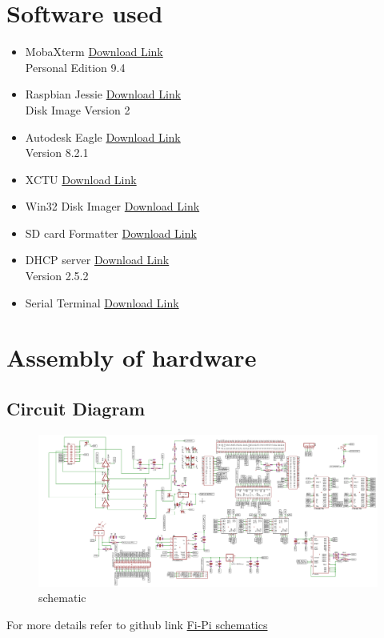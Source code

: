 \documentclass[a4paper,12pt,oneside]{book}
\begin{document}
	\section{Software used}
	\begin{itemize}
		\item MobaXterm  
		\href{http://mobaxterm.mobatek.net/MobaXterm_Setup_9.4.msi} {Download Link}\\
		Personal Edition 9.4
		\item Raspbian Jessie   
		\href{https://downloads.raspberrypi.org/raspbian_latest}{Download Link}\\
		Disk Image Version 2
		\item Autodesk Eagle 
		\href{http://www.cadsoftusa.com/download-eagle/}{Download Link}\\
		Version 8.2.1 
		\item XCTU 
		\href{http://www.digi.com/products/xbee-rf-solutions/xctu-software/xctu#productsupport-utilities}{Download Link}
		\item Win32 Disk Imager
		\href{http://sourceforge.net/projects/win32diskimager/}{Download Link}
		\item SD card Formatter
		\href{https://www.sdcard.org/downloads/formatter_4/eula_windows/}{Download Link}
		\item DHCP server
		\href{http://www.dhcpserver.de/cms/release_notes/2-5-2/}{Download Link}\\
		Version 2.5.2
		\item Serial Terminal 
		\href{https://serial-port-terminal.en.softonic.com/}{Download Link}
	\end{itemize}
	
	\section{Assembly of hardware}
	\subsection*{Circuit Diagram}
	\begin{figure}[!ht]
		\includegraphics[width=1.1\textwidth]{schematic}
		\caption{schematic }
	\end{figure}
For more details refer to github link \href{https://github.com/eYSIP-2017/eYSIP-2017_Fi_Pi/blob/master/Documents/PCB_Schematics/Fi-Pi.sch} {Fi-Pi schematics}
	\pagebreak
\end{document}
